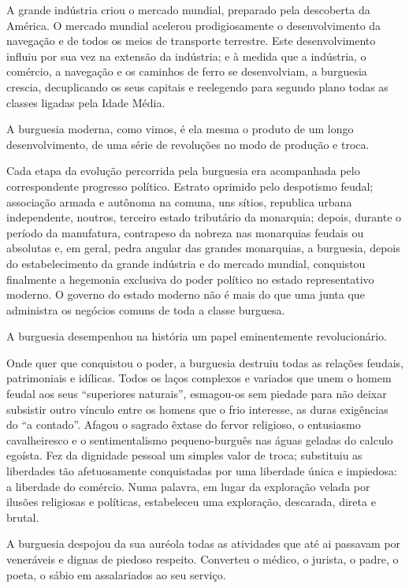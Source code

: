 A grande indústria criou o mercado mundial, preparado pela descoberta
da América. O mercado mundial acelerou prodigiosamente o
desenvolvimento da navegação e de todos os meios de transporte
terrestre. Este desenvolvimento influiu por sua vez na extensão da
indústria; e à medida que a indústria, o comércio, a navegação e os
caminhos de ferro se desenvolviam, a burguesia crescia, decuplicando
os seus capitais e reelegendo para segundo plano todas as classes
ligadas pela Idade Média.

A burguesia moderna, como vimos, é ela mesma o produto de um longo
desenvolvimento, de uma série de revoluções no modo de produção e
troca.

Cada etapa da evolução percorrida pela burguesia era acompanhada pelo
correspondente progresso político. Estrato oprimido pelo despotismo
feudal; associação armada e autônoma na comuna, uns sítios, republica
urbana independente, noutros, terceiro estado tributário da
monarquia; depois, durante o período da manufatura, contrapeso da
nobreza nas monarquias feudais ou absolutas e, em geral, pedra angular
das grandes monarquias, a burguesia, depois do estabelecimento da
grande indústria e do mercado mundial, conquistou finalmente a
hegemonia exclusiva do poder político no estado representativo
moderno. O governo do estado moderno não é mais do que uma junta que
administra os negócios comuns de toda a classe burguesa.

A burguesia desempenhou na história um papel eminentemente
revolucionário.

Onde quer que conquistou o poder, a burguesia destruiu todas as
relações feudais, patrimoniais e idílicas. Todos os laços complexos e
variados que unem o homem feudal aos seus ``superiores naturais'',
esmagou-os sem piedade para não deixar subsistir outro vínculo entre
os homens que o frio interesse, as duras exigências do ``a
contado''. Afagou o sagrado êxtase do fervor religioso, o entusiasmo
cavalheiresco e o sentimentalismo pequeno-burguês nas águas geladas do
calculo egoísta. Fez da dignidade pessoal um simples valor de troca;
substituiu as liberdades tão afetuosamente conquistadas por uma
liberdade única e impiedosa: a liberdade do comércio. Numa palavra, em
lugar da exploração velada por ilusões religiosas e políticas,
estabeleceu uma exploração, descarada, direta e brutal.

A burguesia despojou da sua auréola todas as atividades que até ai
passavam por veneráveis e dignas de piedoso respeito. Converteu o
médico, o jurista, o padre, o poeta, o sábio em assalariados ao seu
serviço.

